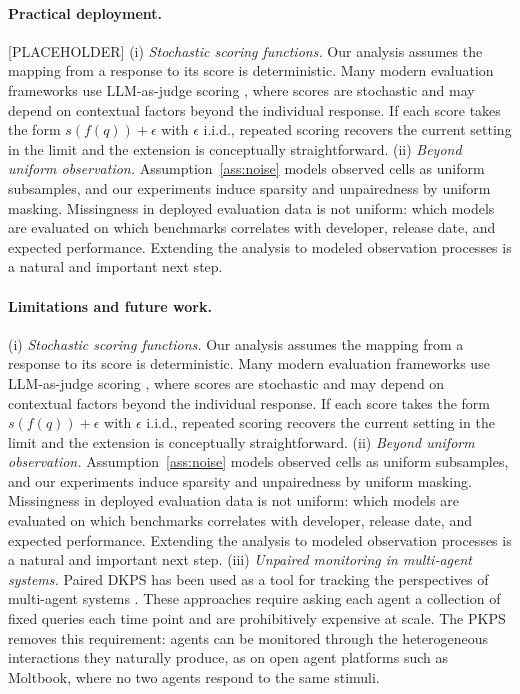 \documentclass{article}
\theoremstyle{definition}
\theoremstyle{remark}
\theoremstyle{plain}
\newcommand{\PKPS}{PKPS\xspace}
\begin{document}
\paragraph{Practical deployment.} [PLACEHOLDER] (i) \textit{Stochastic scoring functions.}
Our analysis assumes the mapping from a response to its score is deterministic.
Many modern evaluation frameworks use LLM-as-judge scoring \citep{zheng2023judging},
where scores are stochastic and may depend on contextual factors beyond the
individual response.
If each score takes the form $s(f(q))+\epsilon$ with $\epsilon$ i.i.d., repeated
scoring recovers the current setting in the limit and the extension is conceptually
straightforward.
(ii) \textit{Beyond uniform observation.}
Assumption~\ref{ass:noise} models observed cells as uniform subsamples, and our
experiments induce sparsity and unpairedness by uniform masking.
Missingness in deployed evaluation data is not uniform: which models are evaluated
on which benchmarks correlates with developer, release date, and expected
performance.
Extending the analysis to modeled observation processes is a natural and important next step.


\paragraph{Limitations and future work.}
(i) \textit{Stochastic scoring functions.}
Our analysis assumes the mapping from a response to its score is deterministic.
Many modern evaluation frameworks use LLM-as-judge scoring \citep{zheng2023judging},
where scores are stochastic and may depend on contextual factors beyond the
individual response.
If each score takes the form $s(f(q))+\epsilon$ with $\epsilon$ i.i.d., repeated
scoring recovers the current setting in the limit and the extension is conceptually
straightforward.
(ii) \textit{Beyond uniform observation.}
Assumption~\ref{ass:noise} models observed cells as uniform subsamples, and our
experiments induce sparsity and unpairedness by uniform masking.
Missingness in deployed evaluation data is not uniform: which models are evaluated
on which benchmarks correlates with developer, release date, and expected
performance.
Extending the analysis to modeled observation processes is a natural and important next step.
(iii) \textit{Unpaired monitoring in multi-agent systems.}
Paired DKPS has been used as a tool for tracking the perspectives of multi-agent
systems \citep{helm2024tracking, bridgeford2026change, helm2026control}.
These approaches require asking each agent a collection of fixed queries each time
point and are prohibitively expensive at scale.
The \PKPS removes this requirement: agents can be monitored through the
heterogeneous interactions they naturally produce, as on open agent platforms such
as Moltbook, where no two agents respond to the same stimuli.
\end{document}
